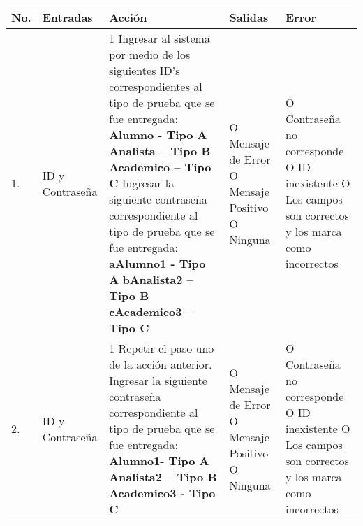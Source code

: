 \begin{longtable}{|p{0.7cm}|p{3cm}|p{6cm}|p{2.3cm}|p{3cm}|}
    \hline	
	\textbf{No.}
	&
	\textbf{Entradas}	
	&
	\textbf{Acción}
	&
	\textbf{Salidas}
	&
	\textbf{Error}
	\\
	\hline
	1.
	&
	ID y Contraseña
	&
	1 Ingresar al sistema por medio de los siguientes ID’s correspondientes al tipo de prueba que se fue entregada:\newline
	\textbf{Alumno - Tipo A}\newline
	\textbf{Analista – Tipo B}\newline 
	\textbf{Academico – Tipo C}\newline
	2 Ingresar la siguiente contraseña correspondiente al tipo de prueba que se fue entregada:\newline
	\textbf{aAlumno1 - Tipo A}\newline
	\textbf{bAnalista2 – Tipo B}\newline
	\textbf{cAcademico3 – Tipo C}\newline
	& 	
	O Mensaje de Error\newline
	O Mensaje Positivo\newline
	O Ninguna
	&
	O Contraseña no corresponde\newline
	O ID inexistente\newline
	O Los campos son correctos y los marca como incorrectos\\
	\hline
	2. 
	&
	ID y Contraseña
	&
	1 Repetir el paso uno de la acción anterior.\newline
	2 Ingresar la siguiente contraseña correspondiente al tipo de prueba que se fue entregada:\newline
	\textbf{Alumno1- Tipo A}\newline
	\textbf{Analista2 – Tipo B}\newline
	\textbf{Academico3 -  Tipo C}\newline
	& 	
	O Mensaje de Error\newline
	O Mensaje Positivo\newline
	O Ninguna
	&
	O Contraseña no corresponde
	O ID inexistente 
	O Los campos son correctos y los marca como incorrectos\\
	\hline
\end{longtable}
